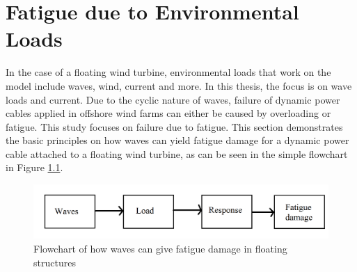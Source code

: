 \chapter{Fatigue due to Environmental Loads}
\label{chap:fatigue}
In the case of a floating wind turbine, environmental loads that work on the model include waves, wind, current and more. In this thesis, the focus is on wave loads and current. Due to the cyclic nature of waves, failure of dynamic power cables applied in offshore wind farms can either be caused by overloading or fatigue.  This study focuses on failure due to fatigue. This section demonstrates the basic principles on how waves can yield fatigue damage for a dynamic power cable attached to a floating wind turbine, as can be seen in the simple flowchart in Figure \ref{fig:flowchart}. 

\begin{figure}[h!]
\centering
\includegraphics[scale=0.75]{figures/box}
\caption[$\; \:$Flowchart of how waves can give fatigue damage in floating structures]{Flowchart of how waves can give fatigue damage in floating structures}
 \label{fig:flowchart}
\end{figure}

